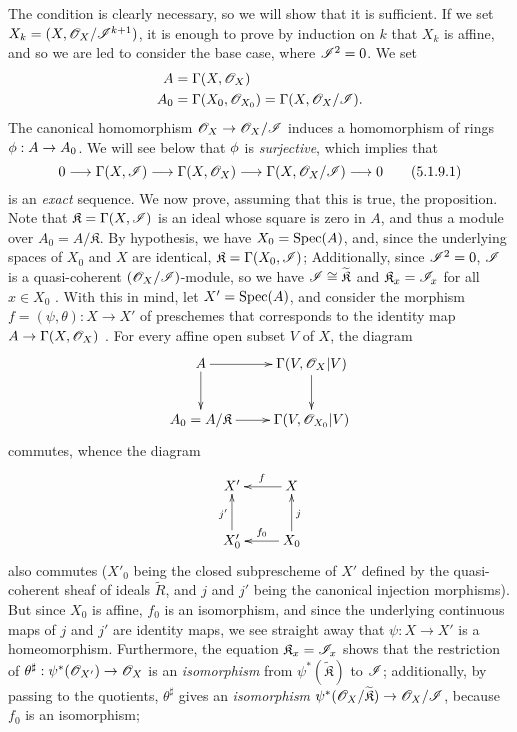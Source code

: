 The condition is clearly necessary, so we will show that it is sufficient.
If we set $X_k=(X,\mathscr{O}_X/\mathscr{I}^{k+1})$, it is enough to prove by induction on $k$ that $X_k$ is affine, and so we are led to consider the base case, where $\mathscr{I}^2=0$.
We set
\begin{align*}
  A&=\Gamma(X,\mathscr{O}_X)\\
  A_0&=\Gamma(X_0,\mathscr{O}_{X_0})=\Gamma(X,\mathscr{O}_X/\mathscr{I}).
\end{align*}
The canonical homomorphism $\sh{O}_X\to\sh{O}_X/\sh{I}$ induces a homomorphism of rings $\vphi:A\to A_0$.
We will see below that $\phi$ is \emph{surjective}, which implies that
\[
\label{I.5.1.9.1}
  0\to\Gamma(X,\sh{I})\to\Gamma(X,\sh{O}_X)\to\Gamma(X,\sh{O}_X/\sh{I})\to 0\tag{5.1.9.1}
\]
is an \emph{exact} sequence.
We now prove, assuming that this is true, the proposition.
Note that $\mathfrak{K}=\Gamma(X,\mathscr{I})$ is an ideal whose square is zero in $A$, and thus a module over $A_0=A/\mathfrak{K}$.
By hypothesis, we have $X_0=\operatorname{Spec}(A)$, and, since the underlying spaces of $X_0$ and $X$ are identical, $\mathfrak{K}=\Gamma(X_0,\mathscr{I})$;
Additionally, since $\mathscr{I}^2=0$, $\mathscr{I}$ is a quasi-coherent $(\mathscr{O}_X/\mathscr{I})$-module, so we have $\mathscr{I}\cong\widetilde{\mathfrak{K}}$ and $\mathfrak{K}_x=\mathscr{I}_x$ for all $x\in X_0$ .
With this in mind, let $X'=\operatorname{Spec}(A)$, and consider the morphism $f=(\psi,\theta):X\to X'$ of preschemes that corresponds to the identity map $A\to\Gamma(X,\sh{O}_X)$ .
For every affine open subset $V$ of $X$, the diagram
\[
  \xymatrix{
    A\ar[r]\ar[d] &
    \Gamma(V,\sh{O}_X|V)\ar[d]\\
    A_0=A/\mathfrak{K}\ar[r] &
    \Gamma(V,\sh{O}_{X_0}|V)
  }
\]
commutes, whence the diagram
\[
  \xymatrix{
    X' &
    X\ar[l]_f\\
    X'_0\ar[u]^{j'} &
    X_0\ar[l]_{f_0}\ar[u]_j
  }
\]
also commutes ($X'_0$ being the closed subprescheme of $X'$ defined by the quasi-coherent sheaf of ideals $\widetilde{R}$, and $j$ and $j'$ being the canonical injection morphisms).
But since $X_0$ is affine, $f_0$ is an isomorphism, and since the underlying continuous maps of $j$ and $j'$ are identity maps, we see straight away that $\psi:X\to X'$ is a homeomorphism.
Furthermore, the equation $\mathfrak{K}_x=\mathscr{I}_x$ shows that the restriction of $\theta^\sharp:\psi^*(\sh{O}_{X'})\to\sh{O}_X$ is an \emph{isomorphism} from $\psi^*(\widetilde{\mathfrak{K}})$ to $\mathscr{I}$;
additionally, by passing to the quotients, $\theta^\sharp$ gives an \emph{isomorphism} $\psi^*(\sh{O}_X/\widetilde{\mathfrak{K}})\to\sh{O}_X/\sh{I}$, because $f_0$ is an isomorphism;
